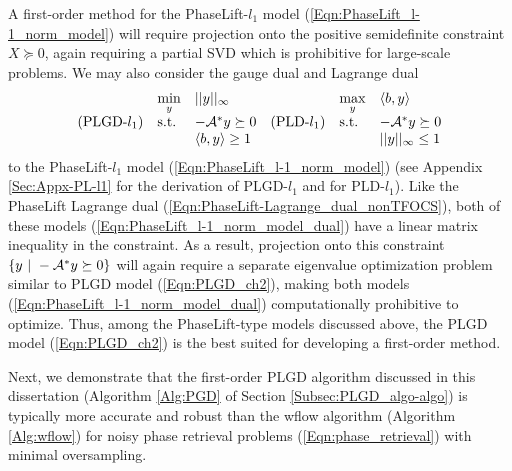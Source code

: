 A first-order method for the PhaseLift-$l_1$ model (\ref{Eqn:PhaseLift_l-1_norm_model}) will require projection onto the positive semidefinite constraint $X \succeq 0$, again requiring a partial SVD which is prohibitive for large-scale problems.  We may also consider the gauge dual and Lagrange dual
\begin{equation} 			\label{Eqn:PhaseLift_l-1_norm_model_dual}
\begin{array}{llllll}

	&	\min\limits_{y}
		&	||y||_\infty
			&&	\max\limits_y
				& \langle b, y \rangle
					\\
			
(\textnormal{PLGD-}l_1)		

	&	\textnormal{s.t.}
		&	-{\mathcal A}^*y \succeq 0
			&(\textnormal{PLD-}l_1)&	\textnormal{s.t.}
				&	- {\mathcal A}^*y \succeq 0
					\\
			
			&&	\langle b, y \rangle \geq 1 &&&	||y||_\infty \leq 1
\end{array}
\end{equation}
to the PhaseLift-$l_1$ model (\ref{Eqn:PhaseLift_l-1_norm_model}) 
(see Appendix \ref{Sec:Appx-PL-l1} for the derivation of PLGD-$l_1$ and  \cite[Chapter 5]{boyd2004convex} for PLD-$l_1$).   
Like the PhaseLift Lagrange dual (\ref{Eqn:PhaseLift-Lagrange_dual_nonTFOCS}), 
both of these models (\ref{Eqn:PhaseLift_l-1_norm_model_dual}) have a linear matrix inequality in the constraint.
As a result, projection onto this constraint $\{ y \ | \ -\caA^*y \succeq 0 \}$ will again require a separate eigenvalue optimization problem similar to PLGD model (\ref{Eqn:PLGD_ch2}), making both models (\ref{Eqn:PhaseLift_l-1_norm_model_dual}) computationally prohibitive to optimize.
Thus, among the PhaseLift-type models discussed above, the PLGD model (\ref{Eqn:PLGD_ch2}) is the best suited for developing a first-order method.







Next, we demonstrate that the first-order PLGD algorithm discussed in this dissertation (Algorithm \ref{Alg:PGD} of Section \ref{Subsec:PLGD_algo-algo}) is typically more accurate and robust than the wflow algorithm (Algorithm \ref{Alg:wflow}) for noisy phase retrieval problems (\ref{Eqn:phase_retrieval}) with minimal oversampling.


